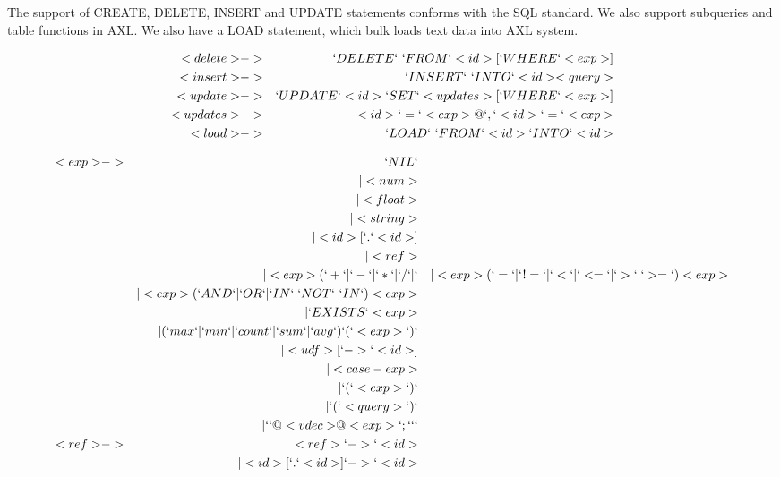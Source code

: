 The support of CREATE, DELETE, INSERT and UPDATE statements conforms
with the SQL standard. We also support subqueries and table functions
in AXL. We also have a LOAD statement, which bulk loads text data into
AXL system.

\begin{bnf}
  \begin{eqnarray*}
    <delete> &->& `DELETE` \ `FROM` <id> [`WHERE` <exp>]\\
    <insert> &->& `INSERT` \ `INTO` <id> <query>\\
    <update> &->& `UPDATE` <id> `SET` <updates> [`WHERE` <exp>]\\
    <updates> &->& <id> `=` <exp> {@ `,` <id> `=` <exp>}\\
    <load> &->& `LOAD` \ `FROM` <id> `INTO` <id>\\
  \end{eqnarray*}
\end{bnf}


\begin{bnf}
  \begin{eqnarray*}
    <exp> &->& `NIL`\\
    && | <num>\\
    && | <float>\\
    && | <string>\\
    && | <id> [ `.` <id>] \\
    && | <ref>\\
    && | <exp> (`+`|`-`|`*`|`/`|`%
    && | <exp> (`=`|`!=`|`<`|`<=`|`>`|`>=`) <exp>\\
    && | <exp> (`AND`|`OR`|`IN`|`NOT`\ `IN`) <exp>\\
    && | `EXISTS` <exp>\\
    && | (`max`|`min`|`count`|`sum`|`avg`) `(`<exp>`)`\\
    && | <udf> [ `->` <id>]\\
    && | <case-exp>\\
    && | `(` <exp> `)`\\
    && | `(` <query> `)`\\
    && | `{` {@ <vdec>} {@ <exp> `;`} `}` \\
    <ref> &->& <ref> `->` <id>\\
    && | <id> [`.` <id>] `->` <id>
  \end{eqnarray*}
\end{bnf}

